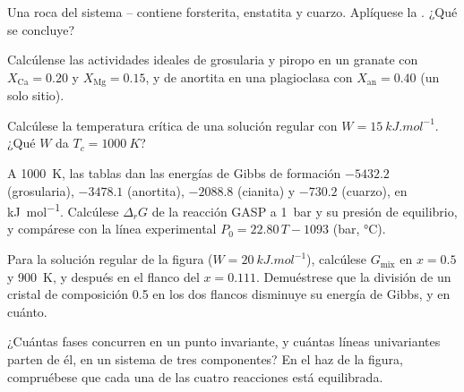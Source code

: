 \begin{exercise}[$\star$]\label{exo:b3:petrological-thermodynamics:2}
Una roca del sistema -- contiene forsterita, enstatita y
cuarzo. Aplíquese la . ¿Qué se concluye?
\end{exercise}

\begin{exercise}[$\star$]\label{exo:b3:petrological-thermodynamics:3}
Calcúlense las actividades ideales de grosularia y piropo en un granate con
$X_{\text{Ca}} = 0.20$ y $X_{\text{Mg}} = 0.15$, y de anortita en una
plagioclasa con $X_{\text{an}} = 0.40$ (un solo sitio).
\end{exercise}

\begin{exercise}[$\star$]\label{exo:b3:petrological-thermodynamics:4}
Calcúlese la temperatura crítica de una solución regular con $W =
\qty{15}{kJ.mol^{-1}}$. ¿Qué $W$ da $T_c = \qty{1000}{K}$?
\end{exercise}

\begin{exercise}[$\star\star$]\label{exo:b3:petrological-thermodynamics:5}
A \qty{1000}{K}, las tablas dan las energías de Gibbs de formación
$-5432.2$ (grosularia), $-3478.1$ (anortita), $-2088.8$ (cianita) y $-730.2$
(cuarzo), en \unit{kJ.mol^{-1}}. Calcúlese $\Delta_rG$ de la reacción GASP a
\qty{1}{bar} y su presión de equilibrio, y compárese con la
línea experimental $P_0 = 22.80\,T - 1093$ (bar, \unit{\celsius}).
\end{exercise}

\begin{exercise}[$\star\star$]\label{exo:b3:petrological-thermodynamics:6}
Para la solución regular de la figura ($W = \qty{20}{kJ.mol^{-1}}$), calcúlese
$G_{\text{mix}}$ en $x = 0.5$ y \qty{900}{K}, y después en el flanco del  $x =
0.111$. Demuéstrese que la división de un cristal de composición 0.5 en los dos flancos
disminuye su energía de Gibbs, y en cuánto.
\end{exercise}

\begin{exercise}[$\star\star$]\label{exo:b3:petrological-thermodynamics:7}
¿Cuántas fases concurren en un punto invariante, y cuántas líneas univariantes
parten de él, en un sistema de tres componentes? En el haz de la figura,
compruébese que cada una de las cuatro reacciones está equilibrada.
\end{exercise}

